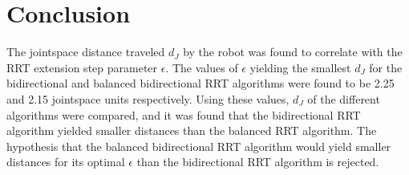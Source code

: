 \section{Conclusion} 
The jointspace distance traveled \(d_J\) by the robot was
found to correlate with the RRT extension step parameter \(\epsilon\).
The values of \(\epsilon\) yielding the smallest \(d_J\) for the
bidirectional and balanced bidirectional RRT algorithms
were found to be 2.25 and 2.15 jointspace units respectively.
Using these values, \(d_J\) of the different algorithms were compared,
and it was found that the bidirectional RRT algorithm yielded
smaller distances than the balanced RRT algorithm.
The hypothesis that the balanced bidirectional RRT algorithm
would yield smaller distances for its optimal \(\epsilon\) than
the bidirectional RRT algorithm is rejected.